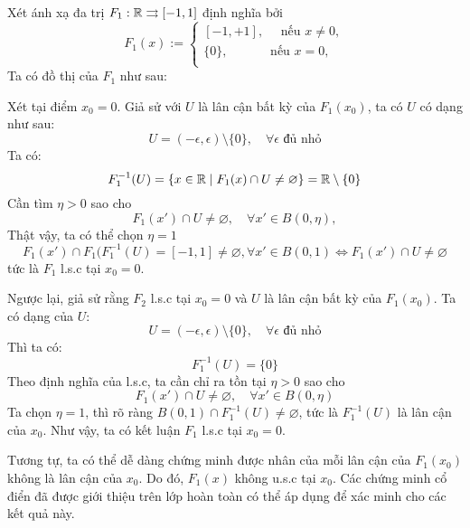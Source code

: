 \documentclass{article}
\begin{document}
\begin{example}
    Xét ánh xạ đa trị $F_1: \mathbb{R} \rightrightarrows [-1, 1]$ định nghĩa bởi
    \begin{equation}
        F_1(x) := \begin{cases}
            [-1, +1],\quad\text{ nếu } x \ne 0,\\
            \{0\},\quad\quad\quad\text{ nếu } x = 0,\\
        \end{cases}
    \end{equation}
    Ta có đồ thị của $F_1$ như sau:
    \begin{figure}[H]
        \centering
        
        \label{fig:f1}
    \end{figure}
    Xét tại điểm $x_0 = 0$. Giả sử với $U$ là lân cận bất kỳ của $F_1(x_0)$,
    ta có $U$ có dạng như sau:
    \begin{equation}
        U = (-\epsilon, \epsilon) \setminus \{0\}, \quad\forall \epsilon \text{ đủ nhỏ}
    \end{equation}
    Ta có:
    \begin{equation}
        F_1^{-1}(U) = \{x \in \mathbb{R} \mid F_1(x) \cap U \ne \varnothing\}
        = \mathbb{R} \setminus \{0\}
    \end{equation}
    Cần tìm $\eta > 0$ sao cho 
    \begin{equation}
        F_1(x') \cap U \ne \varnothing, \quad\forall x' \in B(0, \eta),
    \end{equation}
    Thật vậy, ta có thể chọn $\eta = 1$ 
    \begin{equation}
        F_1(x') \cap F_1(F_1^{-1}(U) = [-1, 1] \ne \varnothing, \forall x' \in B(0, 1) \Leftrightarrow F_1(x') \cap U \ne \varnothing
    \end{equation}
    tức là $F_1$ l.s.c tại $x_0 = 0$.

    Ngược lại, giả sử rằng $F_2$ l.s.c tại $x_0 = 0$ và $U$ là lân cận bất kỳ của $F_1(x_0)$. Ta có dạng của $U$:
    \begin{equation}
        U = (-\epsilon, \epsilon)  \setminus \{0\}, \quad\forall \epsilon \text{ đủ nhỏ}
    \end{equation}
    Thì ta có:
    \begin{equation}
        F_1^{-1}(U) = \{0\}
    \end{equation}
    Theo định nghĩa của l.s.c, ta cần chỉ ra tồn tại $\eta > 0$ sao cho
    \begin{equation}
        F_1(x') \cap U \ne \varnothing,\quad\forall x' \in B(0, \eta)
    \end{equation}
    Ta chọn $\eta = 1$, thì rõ ràng $B(0, 1) \cap F_1^{-1}(U) \ne \varnothing$, tức là $F_1^{-1}(U)$ là lân cận của $x_0$. Như vậy, ta có kết luận $F_1$ l.s.c tại $x_0 = 0$. 

    Tương tự, ta có thể dễ dàng chứng minh được nhân của mỗi lân cận của $F_1(x_0)$ không là lân cận của $x_0$. Do đó, $F_1(x)$ không u.s.c tại $x_0$. Các chứng minh cổ điển đã được giới thiệu trên lớp hoàn toàn có thể áp dụng để xác minh cho các kết quả này. 
\end{example}
\end{document}
